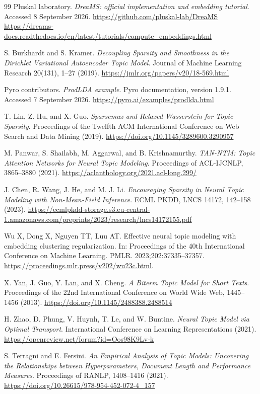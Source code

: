 \documentclass[10pt,a4paper]{article}
\begin{document}
\begin{thebibliography}{99}
Pluskal laboratory. \emph{DreaMS: official implementation and embedding tutorial}.
Accessed 8 September 2026.
\url{https://github.com/pluskal-lab/DreaMS}
\url{https://dreams-docs.readthedocs.io/en/latest/tutorials/compute_embeddings.html}

S. Burkhardt and S. Kramer. \emph{Decoupling Sparsity and Smoothness in the
Dirichlet Variational Autoencoder Topic Model}. Journal of Machine Learning
Research 20(131), 1--27 (2019).
\url{https://jmlr.org/papers/v20/18-569.html}

Pyro contributors. \emph{ProdLDA example}. Pyro documentation, version 1.9.1.
Accessed 7 September 2026.
\url{https://pyro.ai/examples/prodlda.html}

T. Lin, Z. Hu, and X. Guo. \emph{Sparsemax and Relaxed Wasserstein for Topic
Sparsity}. Proceedings of the Twelfth ACM International Conference on Web
Search and Data Mining (2019).
\url{https://doi.org/10.1145/3289600.3290957}

M. Panwar, S. Shailabh, M. Aggarwal, and B. Krishnamurthy.
\emph{TAN-NTM: Topic Attention Networks for Neural Topic Modeling}.
Proceedings of ACL-IJCNLP, 3865--3880 (2021).
\url{https://aclanthology.org/2021.acl-long.299/}

J. Chen, R. Wang, J. He, and M. J. Li. \emph{Encouraging Sparsity in Neural
Topic Modeling with Non-Mean-Field Inference}. ECML PKDD, LNCS 14172,
142--158 (2023).
\url{https://ecmlpkdd-storage.s3.eu-central-1.amazonaws.com/preprints/2023/research/lncs14172155.pdf}

Wu X, Dong X, Nguyen TT, Luu AT.
Effective neural topic modeling with embedding clustering regularization.
In: Proceedings of the 40th International Conference on Machine Learning.
PMLR. 2023;202:37335--37357.
\url{https://proceedings.mlr.press/v202/wu23c.html}.

X. Yan, J. Guo, Y. Lan, and X. Cheng. \emph{A Biterm Topic Model for Short
Texts}. Proceedings of the 22nd International Conference on World Wide Web,
1445--1456 (2013).
\url{https://doi.org/10.1145/2488388.2488514}

H. Zhao, D. Phung, V. Huynh, T. Le, and W. Buntine. \emph{Neural Topic Model
via Optimal Transport}. International Conference on Learning Representations
(2021).
\url{https://openreview.net/forum?id=Oos98K9Lv-k}

S. Terragni and E. Fersini. \emph{An Empirical Analysis of Topic Models:
Uncovering the Relationships between Hyperparameters, Document Length and
Performance Measures}. Proceedings of RANLP, 1408--1416 (2021).
\url{https://doi.org/10.26615/978-954-452-072-4_157}


\end{thebibliography}
\end{document}
